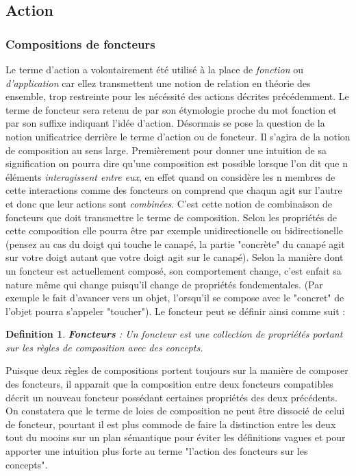 \documentclass[10pt,b5paper, french]{book}
\newtheorem{math_def}{Definition}
\begin{document}
\subsection{Action}
\subsubsection{Compositions de foncteurs}

Le terme d'action a volontairement été utilisé à la place de \textit{fonction} ou \textit{d'application} car ellez transmettent une notion de relation en théorie des ensemble, trop restreinte pour les nécéssité des actions décrites précédemment. Le terme de foncteur sera retenu de par son étymologie proche du mot fonction et par son suffixe indiquant l'idée d'action. Désormais se pose la question de la notion unificatrice derrière le terme d'action ou de foncteur. Il s'agira de la notion de composition au sens large. Premièrement pour donner une intuition de sa signification on pourra dire qu'une composition est possible lorsque l'on dit que n éléments \textit{interagissent entre eux}, en effet quand on considère les n membres de cette interactions comme des foncteurs on comprend que chaqun agit sur l'autre et donc que leur actions sont \textit{combinées}. C'est cette notion de combinaison de foncteurs que doit transmettre le terme de composition. Selon les propriétés de cette composition elle pourra être par exemple unidirectionelle ou bidirectionelle (pensez au cas du doigt qui touche le canapé, la partie "concrète" du canapé agit sur votre doigt autant que votre doigt agit sur le canapé). Selon la manière dont un foncteur est actuellement composé, son comportement change, c'est enfait sa nature même qui change puisqu'il change de propriétés fondementales. (Par exemple le fait d'avancer vers un objet, l'orsqu'il se compose avec le "concret" de l'objet pourra s'appeler "toucher"). Le foncteur peut se définir ainsi comme suit :

\begin{math_def}
\textbf{Foncteurs} : Un foncteur est une collection de propriétés portant sur les règles de composition avec des concepts.
\end{math_def}

Puisque deux règles de compositions portent toujours sur la manière de composer des foncteurs, il apparait que la composition entre deux foncteurs compatibles  décrit un nouveau foncteur possédant certaines propriétés des deux précédents. 
On constatera que le terme de loies de composition ne peut être dissocié de celui de foncteur, pourtant il est plus commode de faire la distinction entre les deux tout du mooins sur un plan sémantique pour éviter les définitions vagues et pour apporter une intuition plus forte au terme "l'action des foncteurs sur les concepts".
\end{document}
